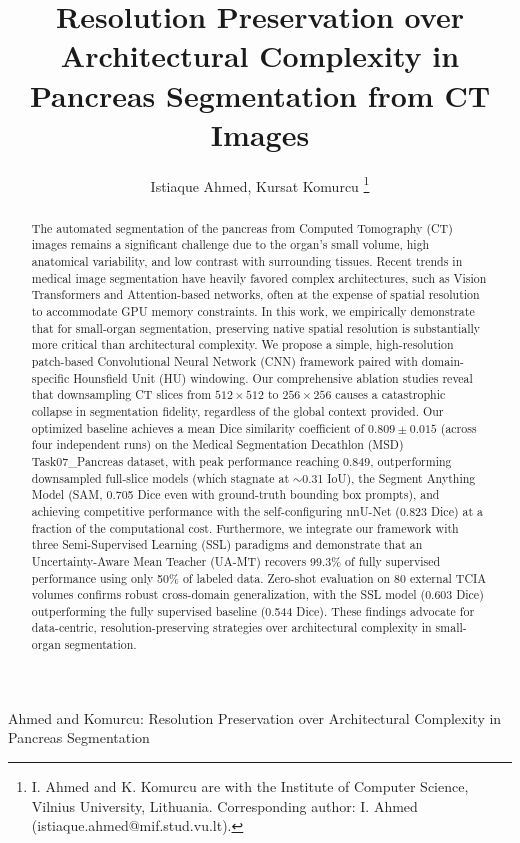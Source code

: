 \documentclass[journal, twocolumn]{IEEEtran}
\begin{document}
\title{Resolution Preservation over Architectural Complexity in Pancreas Segmentation from CT Images}

\author{Istiaque Ahmed,
        Kursat Komurcu
\thanks{I. Ahmed and K. Komurcu are with the Institute of Computer Science, Vilnius University, Lithuania. Corresponding author: I. Ahmed (istiaque.ahmed@mif.stud.vu.lt).}
}

%
{Ahmed and Komurcu: Resolution Preservation over Architectural Complexity in Pancreas Segmentation}

\maketitle

\begin{abstract}
The automated segmentation of the pancreas from Computed Tomography (CT) images remains a significant challenge due to the organ's small volume, high anatomical variability, and low contrast with surrounding tissues. Recent trends in medical image segmentation have heavily favored complex architectures, such as Vision Transformers and Attention-based networks, often at the expense of spatial resolution to accommodate GPU memory constraints. In this work, we empirically demonstrate that for small-organ segmentation, preserving native spatial resolution is substantially more critical than architectural complexity. We propose a simple, high-resolution patch-based Convolutional Neural Network (CNN) framework paired with domain-specific Hounsfield Unit (HU) windowing. Our comprehensive ablation studies reveal that downsampling CT slices from $512 \times 512$ to $256 \times 256$ causes a catastrophic collapse in segmentation fidelity, regardless of the global context provided. Our optimized baseline achieves a mean Dice similarity coefficient of $0.809 \pm 0.015$ (across four independent runs) on the Medical Segmentation Decathlon (MSD) Task07\_Pancreas dataset, with peak performance reaching 0.849, outperforming downsampled full-slice models (which stagnate at $\sim$0.31 IoU), the Segment Anything Model (SAM, 0.705 Dice even with ground-truth bounding box prompts), and achieving competitive performance with the self-configuring nnU-Net (0.823 Dice) at a fraction of the computational cost. Furthermore, we integrate our framework with three Semi-Supervised Learning (SSL) paradigms and demonstrate that an Uncertainty-Aware Mean Teacher (UA-MT) recovers 99.3\% of fully supervised performance using only 50\% of labeled data. Zero-shot evaluation on 80 external TCIA volumes confirms robust cross-domain generalization, with the SSL model (0.603 Dice) outperforming the fully supervised baseline (0.544 Dice). These findings advocate for data-centric, resolution-preserving strategies over architectural complexity in small-organ segmentation.
\end{abstract}
\end{document}
